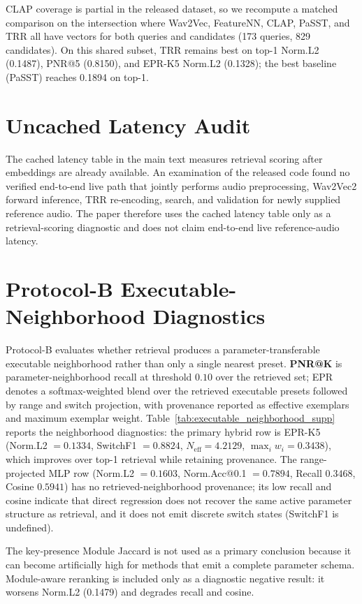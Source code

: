 \documentclass[journal,10pt]{IEEEtran}
\begin{document}
CLAP coverage is partial in the released dataset, so we recompute a matched comparison on the intersection where Wav2Vec, FeatureNN, CLAP, PaSST, and TRR all have vectors for both queries and candidates (173 queries, 829 candidates). On this shared subset, TRR remains best on top-1 Norm.L2 (0.1487), PNR@5 (0.8150), and EPR-K5 Norm.L2 (0.1328); the best baseline (PaSST) reaches 0.1894 on top-1.

\section{Uncached Latency Audit}

The cached latency table in the main text measures retrieval scoring after embeddings are already available. An examination of the released code found no verified end-to-end live path that jointly performs audio preprocessing, Wav2Vec2 forward inference, TRR re-encoding, search, and validation for newly supplied reference audio. The paper therefore uses the cached latency table only as a retrieval-scoring diagnostic and does not claim end-to-end live reference-audio latency.

\section{Protocol-B Executable-Neighborhood Diagnostics}

Protocol-B evaluates whether retrieval produces a parameter-transferable executable neighborhood rather than only a single nearest preset. \textbf{PNR@K} is parameter-neighborhood recall at threshold $0.10$ over the retrieved set; EPR denotes a softmax-weighted blend over the retrieved executable presets followed by range and switch projection, with provenance reported as effective exemplars and maximum exemplar weight. Table~\ref{tab:executable_neighborhood_supp} reports the neighborhood diagnostics: the primary hybrid row is EPR-K5 (Norm.L2 $=0.1334$, SwitchF1 $=0.8824$, $N_{\mathrm{eff}}=4.2129$, $\max_i w_i=0.3438$), which improves over top-1 retrieval while retaining provenance. The range-projected MLP row (Norm.L2 $=0.1603$, Norm.Acc@0.1 $=0.7894$, Recall $0.3468$, Cosine $0.5941$) has no retrieved-neighborhood provenance; its low recall and cosine indicate that direct regression does not recover the same active parameter structure as retrieval, and it does not emit discrete switch states (SwitchF1 is undefined).

\newpage

The key-presence Module Jaccard is not used as a primary conclusion because it can become artificially high for methods that emit a complete parameter schema. Module-aware reranking is included only as a diagnostic negative result: it worsens Norm.L2 (0.1479) and degrades recall and cosine.
\end{document}
